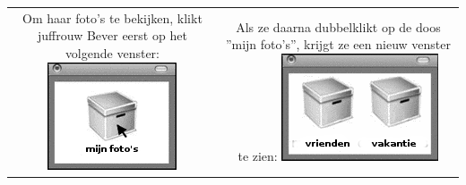 \documentclass[12pt]{article}
\begin{document}
\begin{minipage}{\textwidth}
			\begin{tabulary}{\linewidth}{C C}
				Om haar foto's te bekijken, klikt juffrouw Bever eerst op het volgende venster:
				\includegraphics[width=\linewidth]{image1} &
				Als ze daarna dubbelklikt op de doos ''mijn foto's'', krijgt ze een nieuw venster te zien:
				\includegraphics[width=\linewidth]{image2} \\
			\end{tabulary} \\
	

\end{minipage}
\end{document}
